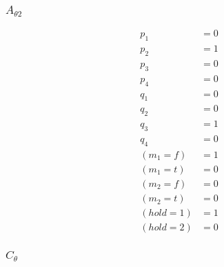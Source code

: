\documentclass{scrartcl}
\begin{document}
\subsubsection{$A_{\theta 2}$}
\begin{align*}
  p_1 &= 0 \\
  p_2 &= 1 \\
  p_3 &= 0 \\
  p_4 &= 0 \\
  q_1 &= 0 \\
  q_2 &= 0 \\
  q_3 &= 1 \\
  q_4 &= 0 \\
  (m_1=f) &= 1 \\
  (m_1=t) &= 0 \\
  (m_2=f) &= 0 \\
  (m_2=t) &= 0 \\
  (hold=1) &= 1 \\
  (hold=2) &= 0
\end{align*}

\subsubsection{$C_\theta$}
\end{document}
